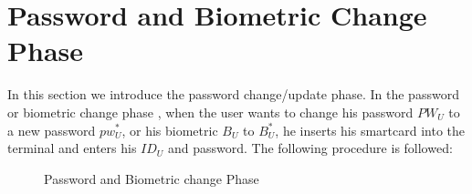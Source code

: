 \documentclass[a4paper,12pt]{report}
\begin{document}
\section{Password and Biometric Change Phase}
In this section we introduce the password change/update phase. In
the password or biometric change phase , when the user wants to
change his password $PW_U$ to a new password $pw_{U}^{*}$, or his
biometric $B_U$ to $B_{U}^*$, he inserts his smartcard into the
terminal and enters his $ID_U$ and password. The following procedure
is followed:

\begin{figure}[htp]
\centering
{}
\caption{Password and Biometric change Phase}
\label{F4}
\end{figure}
\end{document}
